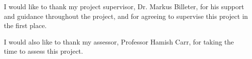 I would like to thank my project supervisor, Dr. Markus Billeter, for his support and guidance throughout the project, and for agreeing to supervise this project in the first place.\newline

I would also like to thank my assessor, Professor Hamish Carr, for taking the time to assess this project.